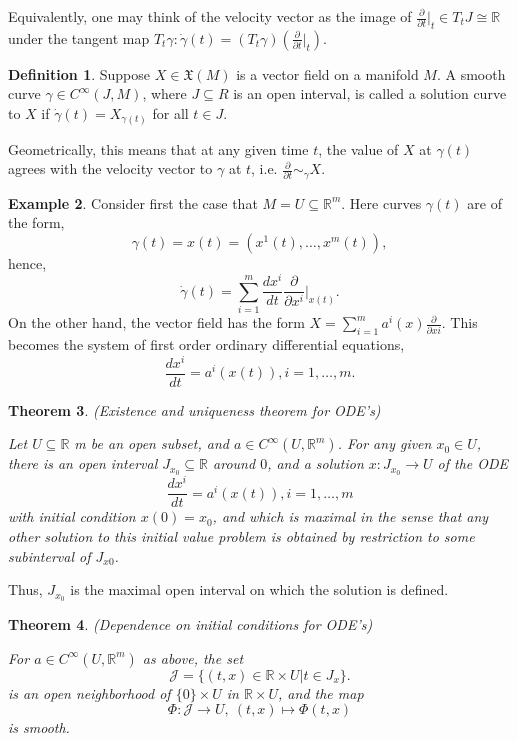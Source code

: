 \documentclass{article}
\newtheorem{theorem}{Theorem}[section]
\theoremstyle{definition}
\newtheorem{defn}[theorem]{Definition}
\newtheorem{example}[theorem]{Example}
\newenvironment{definition}
  {\vspace{8pt}\begin{mdframed}[backgroundcolor=blueish,innertopmargin=4]\begin{defn}}
  {\end{defn}\end{mdframed}\vspace{4pt}}
\begin{document}
Equivalently, one may think of the velocity vector as the image of $\frac{\partial}{\partial t} |_{t} \in T_tJ \cong \mathbb R$ under the tangent map $T_t \gamma : \dot{\gamma}(t) = (T_t\gamma)( \frac{\partial}{\partial t}|_t)$.

\begin{definition}

Suppose $X \in \mathfrak X(M)$ is a vector field on a manifold $M$. A smooth curve $\gamma \in C^\infty(J, M)$, where $J \subseteq R$ is an open interval, is called a solution curve to $X$ if $\dot{\gamma}(t) = X_{\gamma(t)}$ for all $t \in J$.

\end{definition}


Geometrically, this means that at any given time $t$, the value of $X$ at $\gamma(t)$ agrees with the velocity vector to $\gamma$ at $t$, i.e. $\frac{\partial}{\partial t} \sim_\gamma X$.

\begin{example}
Consider first the case that $M = U \subseteq \mathbb R^m$. Here curves $\gamma (t)$ are of the form,
\[
    \gamma(t) = x(t) = (x^1 (t),\dots, x^m (t)),
\]
hence,
\[
    \dot{\gamma}(t) = \sum_{i=1}^m \frac{dx^i}{dt} \frac{\partial}{\partial x^i} \Bigr |_{x(t)}.
\]
On the other hand, the vector field has the form $X = \sum_{i=1}^m a^i (x) \frac{\partial}{\partial x i}$. This becomes the system of first order ordinary differential equations, 
\[
    \frac{dx^i}{dt} = a^i (x(t)), i = 1,\dots, m.
\]
\end{example}

\begin{theorem} (Existence and uniqueness theorem for ODE's)

Let $U \subseteq \mathbb R$ m be an open subset, and $a \in C^\infty(U, \mathbb R^m)$. For any given $x_0 \in U$, there is an open interval $J_{x_0} \subseteq \mathbb R$ around $0$, and a solution $x : J_{x_0} \rightarrow U$ of the ODE
\[
    \frac{d x^i}{dt} = a^i (x(t)), i = 1, \dots, m
\]
with initial condition $x(0) = x_0$, and which is maximal in the sense that any other solution to this initial value problem is obtained by restriction to some subinterval of $J_{x0}$.

\end{theorem}

Thus, $J_{x_0}$ is the maximal open interval on which the solution is defined.

\begin{theorem}  (Dependence on initial conditions for ODE's)

For $a \in C^\infty(U,\mathbb R^m)$ as above, the set 
\[ 
    \mathscr J = \{(t, x) \in \mathbb R \times U | t \in J_x \}.
\]
is an open neighborhood of $\{0\} \times U$ in $\mathbb R \times U$, and the map 
\[
    \Phi : \mathscr  J \rightarrow U, \  (t, x) \mapsto \Phi(t, x)
\]
is smooth.

\end{theorem}
\end{document}
